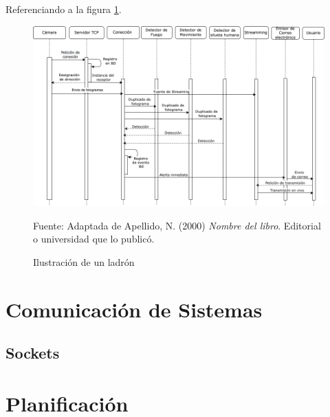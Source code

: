Referenciando a la figura \ref{fig:ejemplo}.
\begin{figure}[H]
    \begin{center}
        \includegraphics[width=18cm]{img/capitulo_4/interaccion.png}
    \end{center}
    \caption{Ilustración de un ladrón}
    Fuente: Adaptada de Apellido, N. (2000) \textit{Nombre del libro}.
    Editorial o universidad que lo publicó.
    \label{fig:ejemplo}
\end{figure}
\section{Comunicación de Sistemas}

\subsection{Sockets}

\section{Planificación}
